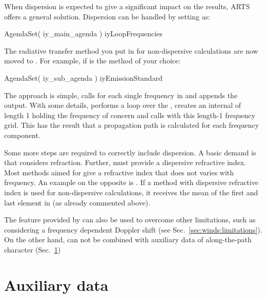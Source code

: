 When dispersion is expected to give a significant impact on the results, ARTS
offers a general solution. Dispersion can be handled by setting
 as:
\begin{code}
AgendaSet( iy_main_agenda ){
  iyLoopFrequencies
}
\end{code}
The radiative transfer method you put in  for
non-dispersive calculations are now moved to . For
example, if  is the method of your choice:
\begin{code}
AgendaSet( iy_sub_agenda ){
  iyEmissionStandard
}
\end{code}
The approach is simple,  calls
 for each single frequency in 
and appends the output. With some details, 
performs a loop over the , creates an internal
 of length 1 holding the frequency of concern and calls
 with this length-1 frequency grid. This has the
result that a propagation path is calculated for each frequency component.

Some more steps are required to correctly include dispersion. A basic demand is
that  considers refraction. Further,
 must provide a dispersive refractive index. Most
methods aimed for  give a refractive index that
does not varies with frequency. An example on the opposite is
. If a method with dispersive refractive
index is used for non-dispersive calculations, it receives the mean of the
first and last element in  (as already commented above).

The feature provided by  can also be used to
overcome other limitations, such as considering a frequency dependent Doppler
shift (see Sec.~\ref{sec:winds:limitations}). On the other hand,
 can not be combined with auxiliary data of
along-the-path character (Sec.~\ref{sec:fm_defs:aux})






\section{Auxiliary data}
\label{sec:fm_defs:aux}

